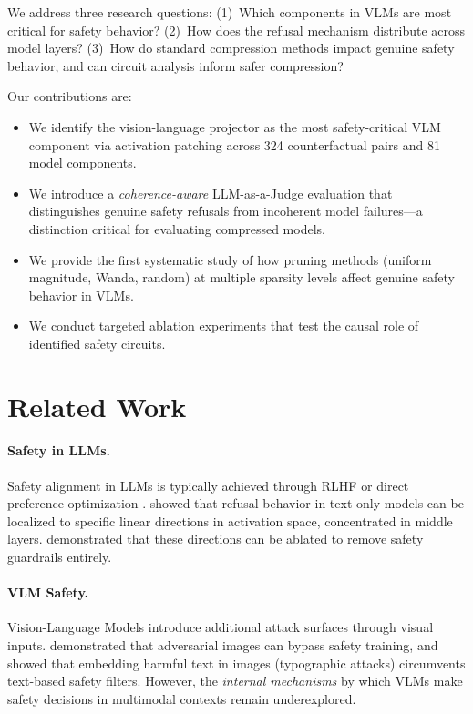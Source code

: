 \documentclass[11pt]{article}
\begin{document}
We address three research questions: (1)~Which components in VLMs are most critical for safety behavior? (2)~How does the refusal mechanism distribute across model layers? (3)~How do standard compression methods impact genuine safety behavior, and can circuit analysis inform safer compression?

Our contributions are:
\begin{itemize}
    \item We identify the vision-language projector as the most safety-critical VLM component via activation patching across 324 counterfactual pairs and 81 model components.
    \item We introduce a \emph{coherence-aware} LLM-as-a-Judge evaluation that distinguishes genuine safety refusals from incoherent model failures---a distinction critical for evaluating compressed models.
    \item We provide the first systematic study of how pruning methods (uniform magnitude, Wanda, random) at multiple sparsity levels affect genuine safety behavior in VLMs.
    \item We conduct targeted ablation experiments that test the causal role of identified safety circuits.
\end{itemize}

\section{Related Work}

\paragraph{Safety in LLMs.} Safety alignment in LLMs is typically achieved through RLHF \citep{ouyang2022training} or direct preference optimization \citep{rafailov2024direct}. \citet{arditi2024refusal} showed that refusal behavior in text-only models can be localized to specific linear directions in activation space, concentrated in middle layers. \citet{li2024inference} demonstrated that these directions can be ablated to remove safety guardrails entirely.

\paragraph{VLM Safety.} Vision-Language Models introduce additional attack surfaces through visual inputs. \citet{qi2024visual} demonstrated that adversarial images can bypass safety training, and \citet{gong2023figstep} showed that embedding harmful text in images (typographic attacks) circumvents text-based safety filters. However, the \emph{internal mechanisms} by which VLMs make safety decisions in multimodal contexts remain underexplored.
\end{document}

